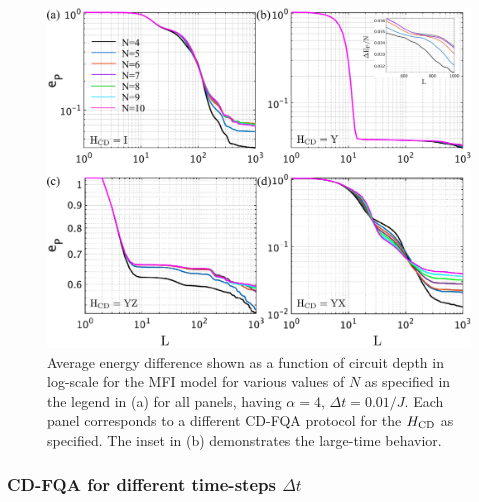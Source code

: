 \documentclass[twocolumn,aps,superscriptaddress,floatfix,longbibliography]{revtex4-2}
\newcommand{\aw}[1]{{\color[rgb]{.9,.5,.2}{#1}}} %
\begin{document}


\begin{figure}
    \centering
    \includegraphics[scale=0.11]{N_final.pdf}
    \caption{Average energy difference shown as a function of circuit depth in log-scale for the MFI model
    for %
    various values of $N$ as specified in the
    legend in (a) for all panels,
    having $\alpha=4$, $\Delta t=0.01/J$. %
    Each panel %
    corresponds to a different CD-FQA protocol
    for the $H_{\rm CD}$ as specified.
    The inset in (b) demonstrates the large-time behavior.
}\label{fig:N_final}
\end{figure}

\subsubsection{CD-FQA for different time-steps $\Delta t$}
\end{document}
